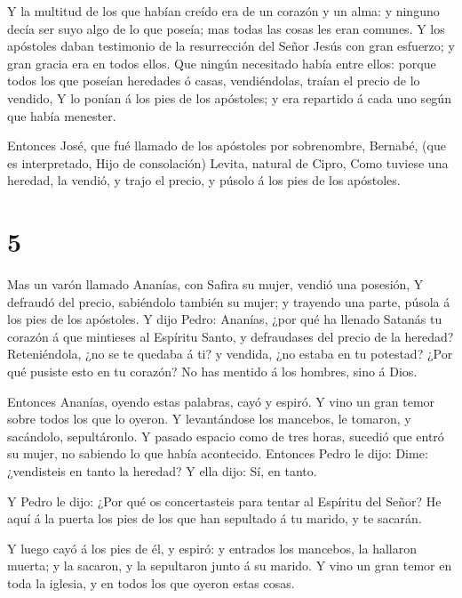  Y la multitud de los que habían creído era de un corazón y
un alma: y ninguno decía ser suyo algo de lo que poseía; mas todas las
cosas les eran comunes.  Y los apóstoles daban testimonio
de la resurrección del Señor Jesús con gran esfuerzo; y gran gracia era
en todos ellos.  Que ningún necesitado había entre ellos:
porque todos los que poseían heredades ó casas, vendiéndolas, traían el
precio de lo vendido,  Y lo ponían á los pies de los
apóstoles; y era repartido á cada uno según que había menester.

 Entonces José, que fué llamado de los apóstoles por
sobrenombre, Bernabé, (que es interpretado, Hijo de consolación) Levita,
natural de Cipro,  Como tuviese una heredad, la vendió, y
trajo el precio, y púsolo á los pies de los apóstoles.

\hypertarget{section-4}{%
\section{5}\label{section-4}}

 Mas un varón llamado Ananías, con Safira su mujer, vendió
una posesión,  Y defraudó del precio, sabiéndolo también su
mujer; y trayendo una parte, púsola á los pies de los apóstoles.
 Y dijo Pedro: Ananías, ¿por qué ha llenado Satanás tu
corazón á que mintieses al Espíritu Santo, y defraudases del precio de
la heredad?  Reteniéndola, ¿no se te quedaba á ti? y
vendida, ¿no estaba en tu potestad? ¿Por qué pusiste esto en tu corazón?
No has mentido á los hombres, sino á Dios.

 Entonces Ananías, oyendo estas palabras, cayó y espiró. Y
vino un gran temor sobre todos los que lo oyeron.  Y
levantándose los mancebos, le tomaron, y sacándolo, sepultáronlo.
 Y pasado espacio como de tres horas, sucedió que entró su
mujer, no sabiendo lo que había acontecido.  Entonces Pedro
le dijo: Dime: ¿vendisteis en tanto la heredad? Y ella dijo: Sí, en
tanto.

 Y Pedro le dijo: ¿Por qué os concertasteis para tentar al
Espíritu del Señor? He aquí á la puerta los pies de los que han
sepultado á tu marido, y te sacarán.

 Y luego cayó á los pies de él, y espiró: y entrados los
mancebos, la hallaron muerta; y la sacaron, y la sepultaron junto á su
marido.  Y vino un gran temor en toda la iglesia, y en
todos los que oyeron estas cosas.

